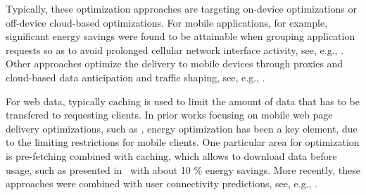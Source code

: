 \documentclass[letterpaper,conference]{IEEEtran}
\begin{document}
Typically, these optimization approaches are targeting on-device optimizations or off-device cloud-based optimizations.
For mobile applications, for example, significant energy savings were found to be attainable when grouping application requests so as to avoid prolonged cellular network interface activity, see, e.g., \cite{BaBaVe09,QiWaGaHuGe12}.
Other approaches optimize the delivery to mobile devices through proxies and cloud-based data anticipation and traffic shaping, see, e.g., \cite{XiHuSaYl11}.

For web data, typically caching is used to limit the amount of data that has to be transfered to requesting clients.
In prior works focusing on mobile web page delivery optimizations, such as \cite{SaIs02}, energy optimization has been a key element, due to the limiting restrictions for mobile clients.
One particular area for optimization is pre-fetching combined with caching, which allows to download data before usage, such as presented in~\cite{ShKuDaWa05} with about 10 \% energy savings.
More recently, these approaches were combined with user connectivity predictions, see, e.g., \cite{ThChWo13}.
\end{document}
